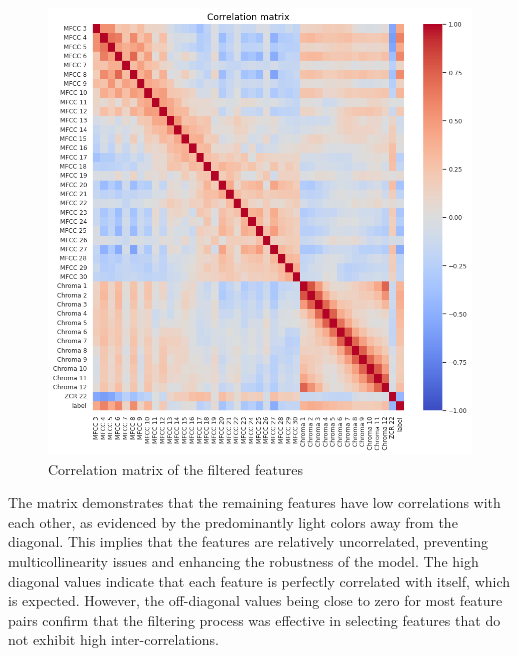 \begin{figure}[h]
    \centering
    \includegraphics[width=\columnwidth]{../images/correlation_matrix.png}
    \caption{Correlation matrix of the filtered features}
    \label{fig:correlation_matrix}
\end{figure}
\noindent
The matrix demonstrates that the remaining features have low correlations with each other, as evidenced by the predominantly
light colors away from the diagonal. This implies that the features are relatively uncorrelated, preventing multicollinearity
issues and enhancing the robustness of the model. The high diagonal values indicate that each feature is perfectly correlated
with itself, which is expected. However, the off-diagonal values being close to zero for most feature pairs confirm that the filtering
process was effective in selecting features that do not exhibit high inter-correlations.


